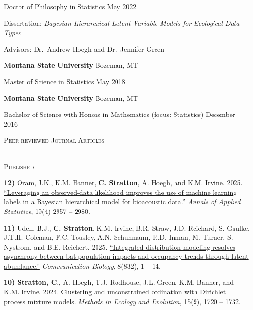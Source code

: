 \documentclass[a4paper]{article}
\newcommand{\lineunder} {
	\vspace*{-8pt} \\
	\hspace*{-18pt} \hrulefill \\
}
\newcommand{\header} [1] {
	{\hspace*{-18pt}\vspace*{6pt} \textcolor{Cerulean}{\textsc{#1}}}
	\vspace*{-6pt} \textcolor{Cerulean}{\lineunder}
}
\newcommand{\subheader} [1] {
	{\hspace*{-9pt}\vspace*{6pt} \textcolor{Cerulean}{\textsc{#1}}}
	\vspace*{-6pt}
}
\begin{document}
Doctor of Philosophy in Statistics \hfill May 2022

Dissertation:
\textit{Bayesian Hierarchical Latent Variable Models for Ecological Data Types}

Advisors: Dr.~Andrew Hoegh and Dr.~Jennifer Green

\vspace{2mm}

\textbf{Montana State University} \hfill Bozeman, MT

Master of Science in Statistics \hfill May 2018

\vspace{2mm}

\textbf{Montana State University} \hfill Bozeman, MT

Bachelor of Science with Honors in Mathematics (focus: Statistics)
\hfill December 2016

\vspace{2mm}

\header{Peer-reviewed Journal Articles}
\vspace*{2mm}

\subheader{Published}
\vspace*{2mm}

\textbf{12)} Oram, J.K., K.M. Banner, \textbf{C. Stratton}, A. Hoegh,
and K.M. Irvine. 2025.
\href{https://doi.org/10.1214/25-AOAS2096}{``Leveraging an observed-data
likelihood improves the use of machine learning labels in a Bayesian
hierarchical model for bioacoustic data.''}
\textit{Annals of Applied Statistics}, 19(4) 2957 -- 2980. \vspace*{2mm}

\textbf{11)} Udell, B.J., \textbf{C. Stratton}, K.M. Irvine, B.R. Straw,
J.D. Reichard, S. Gaulke, J.T.H. Coleman, F.C. Tousley, A.N. Schuhmann,
R.D. Inman, M. Turner, S. Nystrom, and B.E. Reichert. 2025.
\href{https://doi.org/10.1038/s42003-025-08238-x}{``Integrated
distribution modeling resolves asynchrony between bat population impacts
and occupancy trends through latent abundance.''}
\textit{Communication Biology}, 8(832), 1 -- 14. \vspace*{2mm}

\textbf{10) Stratton, C.}, A. Hoegh, T.J. Rodhouse, J.L. Green, K.M.
Banner, and K.M. Irvine. 2024.
\href{https://doi.org/10.1111/2041-210X.14389}{Clustering and
unconstrained ordination with Dirichlet process mixture models.}
\textit{Methods in Ecology and Evolution}, 15(9), 1720 -- 1732.
\vspace*{2mm}
\end{document}
